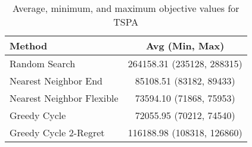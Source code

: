 \begin{table}[h!]
\centering
\begin{tabular}{lc}
\hline
Method & Avg (Min, Max) \\
\hline
Random Search & 264158.31 (235128, 288315) \\
Nearest Neighbor End & 85108.51 (83182, 89433) \\
Nearest Neighbor Flexible & 73594.10 (71868, 75953) \\
Greedy Cycle & 72055.95 (70212, 74540) \\
Greedy Cycle 2-Regret & 116188.98 (108318, 126860) \\
\hline
\end{tabular}
\caption{Average, minimum, and maximum objective values for TSPA}
\label{tab:TSPA_results}
\end{table}
